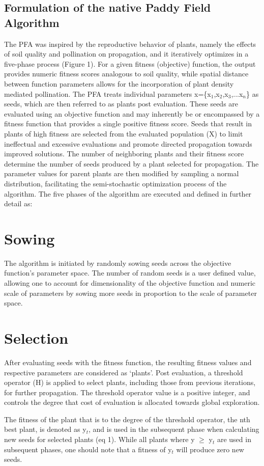 \subsection{Formulation of the native Paddy Field Algorithm}
The PFA was inspired by the reproductive behavior of plants, namely the effects of soil quality and pollination on propagation, and it iteratively optimizes in a five-phase process (Figure 1).  For a given fitness (objective) function, the output provides numeric fitness scores analogous to soil quality, while spatial distance between function parameters allows for the incorporation of plant density mediated pollination.  The PFA treats individual parameters x=\{x$_{1}$,x$_{2}$,x$_{3}$,...x$_{n}$\} as seeds, which are then referred to as plants post evaluation.  These seeds are evaluated using an objective function and may inherently be or encompassed by a fitness function that provides a single positive fitness score.  Seeds that result in plants of high fitness are selected from the evaluated population (X) to limit ineffectual and excessive evaluations and promote directed propagation towards improved solutions.  The number of neighboring plants and their fitness score determine the number of seeds produced by a plant selected for propagation.  The parameter values for parent plants are then modified by sampling a normal distribution, facilitating the semi-stochastic optimization process of the algorithm.  The five phases of the algorithm are executed and defined in further detail as:
\section*{Sowing}
The algorithm is initiated by randomly sowing seeds across the objective function’s parameter space.  The number of random seeds is a user defined value, allowing one to account for dimensionality of the objective function and numeric scale of parameters by sowing more seeds in proportion to the scale of parameter space.
\section*{Selection}
After evaluating seeds with the fitness function, the resulting fitness values and respective parameters are considered as ‘plants’.  Post evaluation, a threshold operator (H) is applied to select plants, including those from previous iterations, for further propagation.  The threshold operator value is a positive integer, and controls the degree that cost of evaluation is allocated towards global exploration.

The fitness of the plant that is to the degree of the threshold operator, the nth best plant, is denoted as y$_{t}$, and is used in the subsequent phase when calculating new seeds for selected plants (eq 1).  While all plants where y $\geq$ y$_{t}$ are used in subsequent phases, one should note that a fitness of y$_{t}$ will produce zero new seeds.